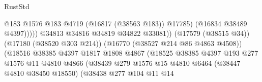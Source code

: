 \begin{lexlean}{RustStd}
\begin{coremodule}
{\begin{coremodule}
{{{{{{{{{{{{{{{{{{{{{{{{{{{{{{{{{{{{{{{{{{{{{{{{{{{{{{{                                                              @183
                                                              @1576
                                                              @183
                                                              @4719
                                                              (@16817 (@38563 @183))
                                                              @17785)
                                                            (@16834 @38489 @4397)))))
                                                    @34813
                                                    @34816
                                                    @34819
                                                    @34822
                                                    @33081))
                                                (@17579 (@38515 @34))
                                                (@17180 (@38520 @303 @214))
                                                (@16770 (@38527 @214 @86 @4863 @4508))
                                                (@18516
                                                  @38385
                                                  @4397
                                                  @1817
                                                  @1808
                                                  @4867
                                                  (@18525
                                                    @38385
                                                    @4397
                                                    @193
                                                    @277
                                                    @1576
                                                    @11
                                                    @4810
                                                    @4866
                                                    (@38439
                                                      @279
                                                      @1576
                                                      @15
                                                      @4810
                                                      @6464
                                                      (@38447 @4810 @38450 @18550)
                                                      (@38438
                                                        @277
                                                        @104
                                                        @11
                                                        @14
}}}}}}}}}}}}}}}}}}}}}}}}}}}}}}}}}}}}}}}}}}}}}}}}}}}}}}}
\end{coremodule}}
\end{coremodule}
\end{lexlean}

